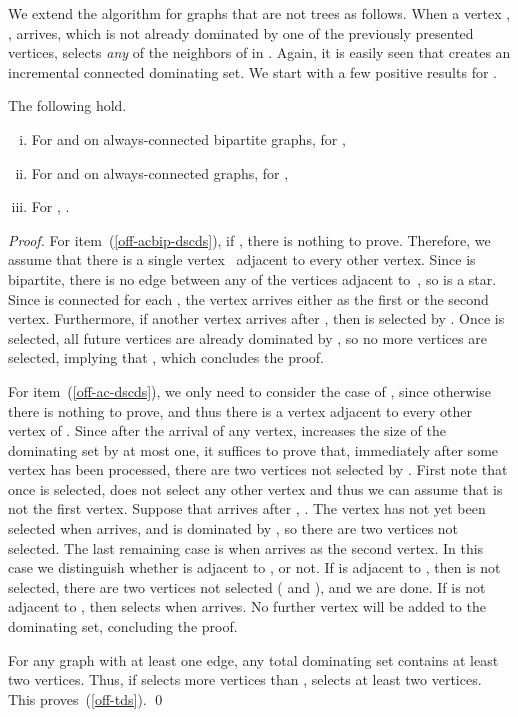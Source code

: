 We extend the \aparent algorithm for graphs that are not trees as
follows. When a vertex , , arrives, which is not
already dominated by one of the previously presented vertices,
\aparent selects \emph{any} of the neighbors of  in .
Again, it is easily seen that \aparent creates an incremental
connected dominating set.
We start with a few positive results for \aparent.

\begin{proposition}
\label{prop:cds-bip}
The following hold.
\begin{enumerate}[(i)]
\item \label{off-acbip-dscds}
 For \ds and \cds on always-connected bipartite graphs, for ,
 
\item \label{off-ac-dscds}
 For \ds and \cds on always-connected graphs, for ,

\item \label{off-tds}
 For \tds, .
\end{enumerate}
\end{proposition}
\begin{proof}
For item~(\ref{off-acbip-dscds}), if , there is
nothing to prove. 
Therefore, we assume that there is a single vertex~
adjacent to every other vertex. Since  is bipartite, there is no 
edge between any of the vertices adjacent to~, so  is a star.
Since  is connected for each , the vertex  arrives either
as the first or the second vertex. Furthermore, if another vertex arrives 
after , then  is selected by \aparent. Once  is selected,
all future vertices are already dominated by , so no
more vertices are selected, implying that ,
which concludes the proof. 

For item~(\ref{off-ac-dscds}), we  only need to consider the case of
,  since otherwise there is 
nothing to prove, and thus there is a vertex  adjacent
to every other vertex of .
Since after the arrival of any vertex, \aparent increases
the size of the dominating set by 
at most one, it suffices to prove that, immediately after some vertex has
been processed, there are two vertices not selected by \aparent.
First note that once  is selected, \aparent does not select
any other vertex and thus we can assume that  is not the first vertex.
Suppose that  arrives after , . The vertex  has not yet
been selected when  arrives, and  is dominated by , so there
are two vertices not selected.
The last remaining case is 
when  arrives as the second vertex. In this case we distinguish whether
 is adjacent to , or not. If  is adjacent to ,
then  is not selected,
there are two vertices not selected ( and ), and we are done.
If  is not
adjacent to , then \aparent selects  when  arrives.
No further vertex will be added to the dominating set, concluding the proof.

For any graph with at least one edge, any total dominating set contains
at least two vertices.
Thus, if \aparent selects more vertices than ,  selects
at least two vertices.
This proves~(\ref{off-tds}).
\qed\end{proof}


